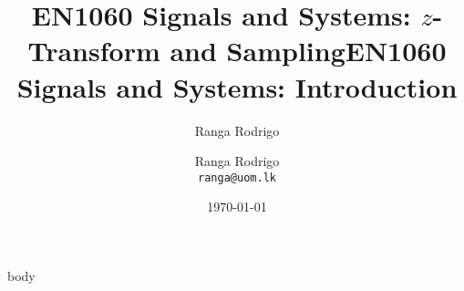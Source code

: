 \documentclass[t, aspectratio=169,xcolor={svgnames}, 10pt, handout]{beamer}
\title{EN1060 Signals and Systems: $z$-Transform and Sampling}
\title{EN1060 Signals and Systems: Introduction}
\author{Ranga Rodrigo}
\author[]{Ranga Rodrigo\\ \texttt{ranga@uom.lk}}
\institute[]{The University of Moratuwa, Sri Lanka}
\date{\today}
\begin{document}
    \begin{frame}
        \titlepage
    \end{frame}


    {body}
















\end{document}
